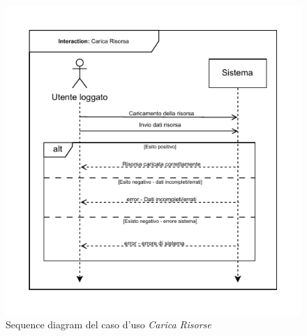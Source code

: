 \documentclass[a4paper]{article}
\begin{document}
\begin{figure}[H]
    \centering
    \includegraphics{./figures/carica_risorsa_sd}
    \caption{Sequence diagram del caso d'uso \textit{Carica Risorse}}
    \label{fig:sd_carica_risorsa}
\end{figure}
\end{document}

